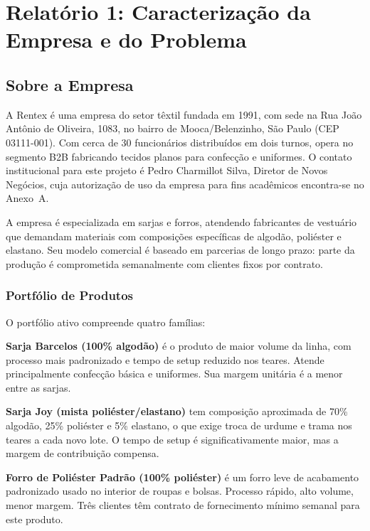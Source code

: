 
\section{Relatório 1: Caracterização da Empresa e do Problema}

\subsection{Sobre a Empresa}

A Rentex é uma empresa do setor têxtil fundada em 1991, com sede na Rua João
Antônio de Oliveira, 1083, no bairro de Mooca/Belenzinho, São Paulo
(CEP 03111-001). Com cerca de 30 funcionários distribuídos em dois turnos, opera
no segmento B2B fabricando tecidos planos para confecção e uniformes. O contato
institucional para este projeto é Pedro Charmillot Silva, Diretor de Novos
Negócios, cuja autorização de uso da empresa para fins acadêmicos encontra-se
no Anexo~A.

A empresa é especializada em sarjas e forros, atendendo fabricantes de vestuário
que demandam materiais com composições específicas de algodão, poliéster e
elastano. Seu modelo comercial é baseado em parcerias de longo prazo: parte da
produção é comprometida semanalmente com clientes fixos por contrato.

\subsubsection{Portfólio de Produtos}

O portfólio ativo compreende quatro famílias:

\textbf{Sarja Barcelos (100\% algodão)} é o produto de maior volume da linha,
com processo mais padronizado e tempo de setup reduzido nos teares. Atende
principalmente confecção básica e uniformes. Sua margem unitária é a menor entre
as sarjas.

\textbf{Sarja Joy (mista poliéster/elastano)} tem composição aproximada de
70\% algodão, 25\% poliéster e 5\% elastano, o que exige troca de urdume e
trama nos teares a cada novo lote. O tempo de setup é significativamente maior,
mas a margem de contribuição compensa.

\textbf{Forro de Poliéster Padrão (100\% poliéster)} é um forro leve de
acabamento padronizado usado no interior de roupas e bolsas. Processo rápido,
alto volume, menor margem. Três clientes têm contrato de fornecimento mínimo
semanal para este produto.

